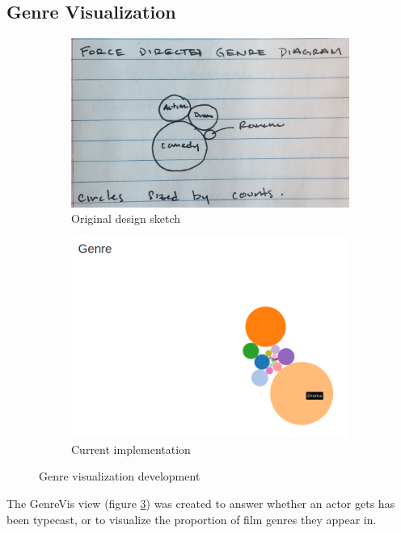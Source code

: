 \documentclass[12pt]{article}
\begin{document}
\subsection{Genre Visualization}

	\begin{figure}[h!]
		\centering
		\begin{subfigure}[t]{.5\textwidth}
		  \centering
		  \includegraphics[width=\linewidth]{images/genreVis_crop.png}
		  \caption{Original design sketch}
		  \label{fig:sub1}
		\end{subfigure}%
		\begin{subfigure}[t]{.8\textwidth}
		  \centering
		  \includegraphics[width=.7\linewidth]{images/genreVis.png}
		  \caption{Current implementation}
		  \label{fig:sub2}
		\end{subfigure}%
		\caption{Genre visualization development}
		\label{fig:genreVis}
	\end{figure}

	
The GenreVis view (figure \ref{fig:genreVis}) was created to answer whether  an actor gets has been typecast, or to visualize the proportion of film genres they appear in.  
\end{document}
